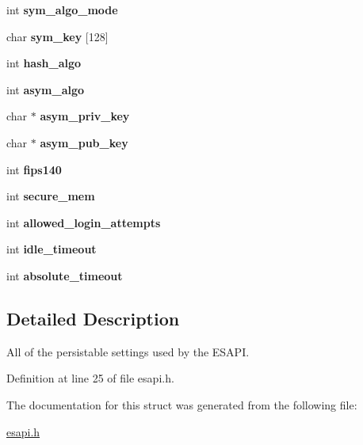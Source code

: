 \begin{DoxyCompactItemize}
\item 
\hypertarget{structesapi__ctx_a8cfeee6158ff74f8b3158bc09c58622a}{
int {\bfseries sym\_\-algo\_\-mode}}
\label{structesapi__ctx_a8cfeee6158ff74f8b3158bc09c58622a}

\item 
\hypertarget{structesapi__ctx_ad0b500f28829f8f25c25b3736510e19f}{
char {\bfseries sym\_\-key} \mbox{[}128\mbox{]}}
\label{structesapi__ctx_ad0b500f28829f8f25c25b3736510e19f}

\item 
\hypertarget{structesapi__ctx_adbc68e938ffaf5b4791b3daad5b62d9c}{
int {\bfseries hash\_\-algo}}
\label{structesapi__ctx_adbc68e938ffaf5b4791b3daad5b62d9c}

\item 
\hypertarget{structesapi__ctx_a51c0c8579a251a0974c619722829e0b7}{
int {\bfseries asym\_\-algo}}
\label{structesapi__ctx_a51c0c8579a251a0974c619722829e0b7}

\item 
\hypertarget{structesapi__ctx_a7324bbd8153f626050077ffd96a13029}{
char $\ast$ {\bfseries asym\_\-priv\_\-key}}
\label{structesapi__ctx_a7324bbd8153f626050077ffd96a13029}

\item 
\hypertarget{structesapi__ctx_aed68c70b60552fab9014448e8fc41456}{
char $\ast$ {\bfseries asym\_\-pub\_\-key}}
\label{structesapi__ctx_aed68c70b60552fab9014448e8fc41456}

\item 
\hypertarget{structesapi__ctx_af91701b84786ded481472433b2a66ebc}{
int {\bfseries fips140}}
\label{structesapi__ctx_af91701b84786ded481472433b2a66ebc}

\item 
\hypertarget{structesapi__ctx_aa4e96bbb14272b617401089b14305f21}{
int {\bfseries secure\_\-mem}}
\label{structesapi__ctx_aa4e96bbb14272b617401089b14305f21}

\item 
\hypertarget{structesapi__ctx_a45113d70d8f430611899ddd2c55c716a}{
int {\bfseries allowed\_\-login\_\-attempts}}
\label{structesapi__ctx_a45113d70d8f430611899ddd2c55c716a}

\item 
\hypertarget{structesapi__ctx_af3f5faf82f7eacda88ec792e6a69d4bb}{
int {\bfseries idle\_\-timeout}}
\label{structesapi__ctx_af3f5faf82f7eacda88ec792e6a69d4bb}

\item 
\hypertarget{structesapi__ctx_a8b0b0b2c9cf75e10765c2a105d8a2fa5}{
int {\bfseries absolute\_\-timeout}}
\label{structesapi__ctx_a8b0b0b2c9cf75e10765c2a105d8a2fa5}

\end{DoxyCompactItemize}


\subsection{Detailed Description}
All of the persistable settings used by the ESAPI. 

Definition at line 25 of file esapi.h.



The documentation for this struct was generated from the following file:\begin{DoxyCompactItemize}
\item 
\hyperlink{esapi_8h}{esapi.h}\end{DoxyCompactItemize}

